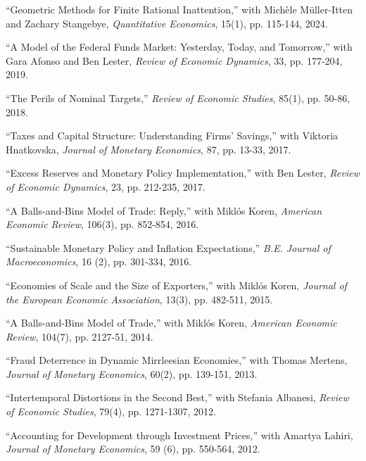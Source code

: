 \documentclass[letterpaper, 12pt]{article}
\renewenvironment{itemize}{
  \begin{list}{}{
    \setlength{\leftmargin}{2em}
  }
}{
  \end{list}
}
\begin{document}
\begin{itemize}

\item ``Geometric Methods for Finite Rational Inattention,'' with Mich\`ele M\"uller-Itten and Zachary Stangebye, \textit{Quantitative Economics}, 15(1), pp. 115-144, 2024.

\item ``A Model of the Federal Funds Market: Yesterday, Today, and Tomorrow,'' with Gara Afonso and Ben Lester, {\it Review of Economic Dynamics}, 33, pp. 177-204, 2019.

\item ``The Perils of Nominal Targets,'' {\it Review of Economic Studies}, 85(1), pp. 50-86, 2018.

\item ``Taxes and Capital Structure: Understanding Firms' Savings,'' with Viktoria Hnatkovska, {\it Journal of Monetary Economics}, 87, pp. 13-33, 2017.

\item ``Excess Reserves and Monetary Policy Implementation,'' with Ben Lester, {\it Review of Economic Dynamics}, 23, pp. 212-235, 2017.

\item ``A Balls-and-Bins Model of Trade: Reply,'' with Mikl\'os Koren, {\it American Economic Review}, 106(3), pp. 852-854, 2016.

\item ``Sustainable Monetary Policy and Inflation Expectations,'' {\it B.E. Journal of Macroeconomics}, 16 (2), pp. 301-334, 2016.

\item ``Economies of Scale and the Size of Exporters,'' with Mikl\'os Koren, {\it Journal of the European Economic Association}, 13(3), pp. 482-511, 2015.

\item ``A Balls-and-Bins Model of Trade,'' with Mikl\'os Koren, {\it American Economic Review}, 104(7), pp. 2127-51, 2014.

\item ``Fraud Deterrence in Dynamic Mirrleesian Economies,'' with Thomas Mertens, {\it Journal of Monetary Economics}, 60(2), pp. 139-151, 2013.

\item ``Intertemporal Distortions in the Second Best,'' with Stefania Albanesi, {\it Review of Economic Studies}, 79(4), pp. 1271-1307, 2012.

\item ``Accounting for Development through Investment Prices,'' with Amartya Lahiri, {\it Journal of Monetary Economics}, 59 (6), pp. 550-564, 2012.


\end{itemize}
\end{document}
